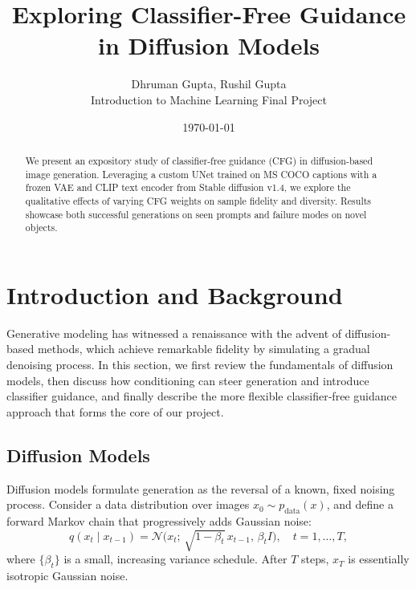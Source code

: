 \documentclass[11pt,a4paper]{article}
\title{Exploring Classifier-Free Guidance in Diffusion Models}
\author{Dhruman Gupta, Rushil Gupta \\ Introduction to Machine Learning Final Project}
\date{\today}
\begin{document}
\maketitle

\begin{abstract}
We present an expository study of classifier-free guidance (CFG) in diffusion-based image generation. Leveraging a custom UNet trained on MS COCO captions with a frozen VAE and CLIP text encoder from Stable diffusion v1.4, we explore the qualitative effects of varying CFG weights on sample fidelity and diversity. Results showcase both successful generations on seen prompts and failure modes on novel objects.
\end{abstract}

\section{Introduction and Background}

Generative modeling has witnessed a renaissance with the advent of diffusion-based methods, which achieve remarkable fidelity by simulating a gradual denoising process. In this section, we first review the fundamentals of diffusion models, then discuss how conditioning can steer generation and introduce classifier guidance, and finally describe the more flexible classifier‐free guidance approach that forms the core of our project.

\subsection{Diffusion Models}

Diffusion models \cite{sohl2015deep,ho2020denoising} formulate generation as the reversal of a known, fixed noising process.  Consider a data distribution over images $x_0\sim p_{\mathrm{data}}(x)$, and define a forward Markov chain that progressively adds Gaussian noise:
\begin{equation}\label{eq:forward}
q(x_t \mid x_{t-1}) = \mathcal{N}\!\bigl(x_t;\,\sqrt{1-\beta_t}\,x_{t-1},\,\beta_t I\bigr),\quad t=1,\dots,T,
\end{equation}
where $\{\beta_t\}$ is a small, increasing variance schedule.  After $T$ steps, $x_T$ is essentially isotropic Gaussian noise.
\end{document}
